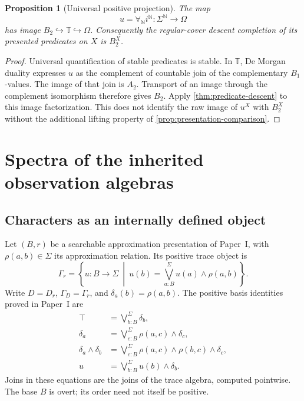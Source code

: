 \documentclass[11pt,a4paper]{article}
\numberwithin{equation}{section}
\newtheorem{proposition}[proposition]{Proposition}
\theoremstyle{definition}
\theoremstyle{remark}
\theoremstyle{plain}
\newcommand{\N}{\mathbb N}
\newcommand{\TV}{\mathbb T}
\newcommand{\incl}{\hookrightarrow}
\begin{document}
\begin{proposition}[Universal positive projection]
\label{prop:universal-classifier}
The map
\[
 u=\forall_{\N}i^{\N}:\Sigma^{\N}\longrightarrow\Omega
\]
has image $B_2\incl\TV\incl\Omega$. Consequently the regular-cover
descent completion of its presented predicates on $X$ is $B_2^X$.
\end{proposition}
\begin{proof}
Universal quantification of stable predicates is stable. In $\TV$,
De Morgan duality expresses $u$ as the complement of countable join
of the complementary $B_1$-values. The image of that join is $A_2$.
Transport of an image through the complement isomorphism therefore
gives $B_2$. Apply \cref{thm:predicate-descent} to this image
factorization. This does not identify the raw image of $u^X$ with
$B_2^X$ without the additional lifting property of
\cref{prop:presentation-comparison}.
\end{proof}

\section{Spectra of the inherited observation algebras}
\label{sec:spectra}

\subsection{Characters as an internally defined object}

Let $(B,r)$ be a searchable approximation presentation of Paper~I, with
$\rho(a,b)\in\Sigma$ its approximation relation. Its positive trace
object is
\begin{equation}\label{eq:trace-object}
 \Gamma_r=\left\{u:B\to\Sigma\ \middle|\
 u(b)=\bigvee_{a:B}^{\Sigma}u(a)\wedge\rho(a,b)\right\}.
\end{equation}
Write $D=D_r$, $\Gamma_D=\Gamma_r$, and $\delta_a(b)=\rho(a,b)$.
The positive basis identities proved in Paper~I are
\begin{align}
 \top&=\bigvee_{b:B}^{\Sigma}\delta_b,
 \label{eq:basis-top}\\
 \delta_a&=\bigvee_{c:B}^{\Sigma}\rho(a,c)\wedge\delta_c,
 \label{eq:basis-round}\\
 \delta_a\wedge\delta_b
 &=\bigvee_{c:B}^{\Sigma}\rho(a,c)\wedge\rho(b,c)\wedge\delta_c,
 \label{eq:basis-meet}\\
 u&=\bigvee_{b:B}^{\Sigma}u(b)\wedge\delta_b.
 \label{eq:basis-expansion}
\end{align}
Joins in these equations are the joins of the trace algebra, computed
pointwise. The base $B$ is overt; its order need not itself be positive.
\end{document}

